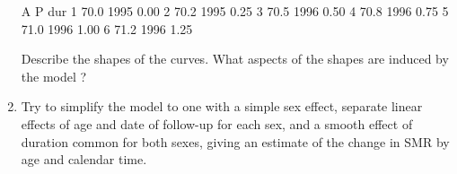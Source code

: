 \documentclass[
]{book}
\newenvironment{Shaded}{\begin{snugshade}}{\end{snugshade}}
\newcommand{\AttributeTok}[1]{\textcolor[rgb]{0.13,0.29,0.53}{#1}}
\newcommand{\ConstantTok}[1]{\textcolor[rgb]{0.56,0.35,0.01}{#1}}
\newcommand{\DecValTok}[1]{\textcolor[rgb]{0.00,0.00,0.81}{#1}}
\newcommand{\FloatTok}[1]{\textcolor[rgb]{0.00,0.00,0.81}{#1}}
\newcommand{\FunctionTok}[1]{\textcolor[rgb]{0.13,0.29,0.53}{\textbf{#1}}}
\newcommand{\NormalTok}[1]{#1}
\newcommand{\SpecialCharTok}[1]{\textcolor[rgb]{0.81,0.36,0.00}{\textbf{#1}}}
\newcommand{\StringTok}[1]{\textcolor[rgb]{0.31,0.60,0.02}{#1}}
\begin{document}
\begin{enumerate}
\begin{Shaded}
\begin{Highlighting}[]
\NormalTok{     A    P  dur}
\NormalTok{1 70.0 1995 0.00}
\NormalTok{2 70.2 1995 0.25}
\NormalTok{3 70.5 1996 0.50}
\NormalTok{4 70.8 1996 0.75}
\NormalTok{5 71.0 1996 1.00}
\NormalTok{6 71.2 1996 1.25}
\end{Highlighting}
\end{Shaded}

\begin{Shaded}
\end{Shaded}

  Describe the shapes of the curves. What aspects of the shapes are
  induced by the model ?
\item
  Try to simplify the model to one with a simple sex effect,
  separate linear effects of age and date of follow-up for each
  sex, and a smooth effect of duration common for both sexes,
  giving an estimate of the change in SMR by age and calendar
  time.


\end{enumerate}
\end{document}
